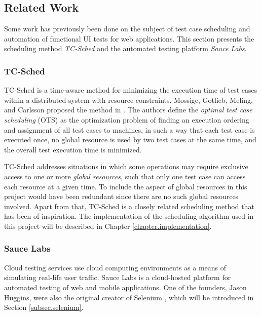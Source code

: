 \subsection{Related Work}
Some work has previously been done on the subject of test case scheduling and automation of functional UI tests for web applications. This section presents the scheduling method \emph{TC-Sched} and the automated testing platform \emph{Sauce Labs}.

\subsubsection{TC-Sched}
TC-Sched is a time-aware method for minimizing the execution time of test cases within a distributed system with resource constraints. Mossige, Gotlieb, Meling, and Carlsson proposed the method in \cite{tcsched}. The authors define the \emph{optimal test case scheduling} (OTS) as the optimization problem of finding an execution ordering and assignment of all test cases to machines, in such a way that each test case is executed once, no global resource is used by two test cases at the same time, and the overall test execution time is minimized.

TC-Sched addresses situations in which some operations may require exclusive access to one or more \emph{global resources}, such that only one test case can access each resource at a given time. To include the aspect of global resources in this project would have been redundant since there are no such global resources involved. Apart from that, TC-Sched is a closely related scheduling method that has been of inspiration. The implementation of the scheduling algorithm used in this project will be described in Chapter \ref{chapter.implementation}.


\subsubsection{Sauce Labs}
Cloud testing services use cloud computing environments as a means of simulating real-life user traffic. Sauce Labs is a cloud-hosted platform for automated testing of web and mobile applications. One of the founders, Jason Huggins, were also the original creator of Selenium \cite{SauceLabsPressCoverage}, which will be introduced in Section \ref{subsec.selenium}.

